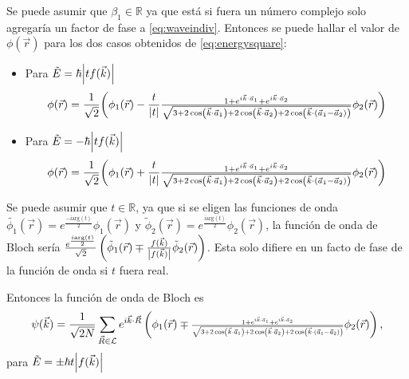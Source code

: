 Se puede asumir que $\beta_1\in \mathbb{R}$ ya que está si fuera un número complejo solo agregaría un factor de fase a \eqref{eq:waveindiv}. Entonces se puede hallar el valor de $\phi(\vec{r})$ para los dos casos obtenidos de \eqref{eq:energysquare}:
\begin{itemize}
  \item Para $\tilde{E} = \hbar\abs{tf(\vec{k})}$
	      \begin{equation}
		      \phi(\vec{r}) = \frac{1}{\sqrt{2}}\bigg(\phi_1(\vec{r})-\frac{t}{\abs{t}}\resizebox{0.5\textwidth}{!}{$\frac{1 + e^{i \vec{k}\cdot \vec{a}_1}+e^{i \vec{k}\cdot \vec{a}_2}}{\sqrt{3+2 \cos\left(\vec{k} \cdot \vec{a}_1\right)+2 \cos\left(\vec{k}\cdot \vec{a}_2\right)+2 \cos\left(\vec{k}\cdot (\vec{a}_1-\vec{a}_2)\right)}}$}\phi_2(\vec{r})\bigg)
	      \end{equation}
      \item Para $\tilde{E} = -\hbar\abs{tf(\vec{k})}$
	      \begin{equation}
		      \phi(\vec{r}) = \frac{1}{\sqrt{2}}\bigg(\phi_1(\vec{r})+\frac{t}{\abs{t}}\resizebox{0.5\textwidth}{!}{$\frac{1 + e^{i \vec{k}\cdot \vec{a}_1}+e^{i \vec{k}\cdot \vec{a}_2}}{\sqrt{3+2 \cos\left(\vec{k} \cdot \vec{a}_1\right)+2 \cos\left(\vec{k}\cdot \vec{a}_2\right)+2 \cos\left(\vec{k}\cdot (\vec{a}_1-\vec{a}_2)\right)}}$}\phi_2(\vec{r})\bigg)
	      \end{equation}
\end{itemize}
Se puede asumir que $t \in \mathbb{R}$, ya que si se eligen las funciones de onda $\tilde{\phi_1}(\vec{r}) = e^{\frac{-i\text{arg}(t)}{2}}\phi_1(\vec{r})$ y $\tilde{\phi}_2(\vec{r}) = e^{\frac{i\text{arg}(t)}{2}}\phi_2(\vec{r})$, la función de onda de Bloch sería $\frac{e^{\frac{i\text{arg}(t)}{2}}}{\sqrt{2}}\left(\tilde{\phi}_1(\vec{r}) \mp \frac{f(\vec{k})}{\abs{f(\vec{k})}}\tilde{\phi}_2(\vec{r})\right)$. Esta solo difiere en un facto de fase de la función de onda si $t$ fuera real.\par
Entonces la función de onda de Bloch es
\begin{equation}
   \psi(\vec{k}) = \frac{1}{\sqrt{2N}}\sum_{\vec{R} \in \mathcal{L}}e^{i \vec{k}\cdot \vec{R}} \left(\phi_1(\vec{r}) \mp \resizebox{0.4\textwidth}{!}{$\frac{1 + e^{i \vec{k}\cdot \vec{a}_1}+e^{i \vec{k}\cdot \vec{a}_2}}{\sqrt{3+2 \cos\left(\vec{k} \cdot \vec{a}_1\right)+2 \cos\left(\vec{k}\cdot \vec{a}_2\right)+2 \cos\left(\vec{k}\cdot (\vec{a}_1-\vec{a}_2)\right)}}$}\phi_2(\vec{r})\right),
\end{equation}
para $\tilde{E} = \pm \hbar t \abs{f(\vec{k})}$
